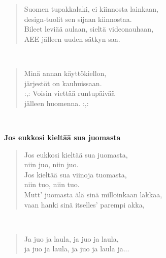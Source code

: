 \noindent\begin{minipage}{\linewidth}
\begin{verse}
	Suomen tupakkalaki, ei kiinnosta lainkaan,\\
	design-tuolit sen sijaan kiinnostaa.\\
	Bileet leviää aulaan, sieltä videonauhaan,\\
	AEE jälleen uuden sätkyn saa.\\
\end{verse}
\end{minipage}\\[10pt]
\noindent\begin{minipage}{\linewidth}
\begin{verse}
	Minä annan käyttökiellon,\\
	järjestöt on kauhuissaan.\\
	\hspace{0pt-\widthof{:,: }}:,: Voisin viettää runtupäivää\\
	jälleen huomenna. :,:\\
\end{verse}
\end{minipage}\\[10pt]
%
%
\noindent\begin{minipage}{\linewidth}
\vspace{5pt}
\parbox[t]{0.85\linewidth}{\raggedright {\large\bf Jos eukkosi kieltää sua juomasta}\\[6pt]}
\begin{verse}
	Jos eukkosi kieltää sua juomasta,\\
	niin juo, niin juo.\\
	Jos kieltää sua viinoja tuomasta,\\
	niin tuo, niin tuo.\\
	Mutt' juomasta älä sinä milloinkaan lakkaa,\\
	vaan hanki sinä itselles' parempi akka,\\
\end{verse}
\end{minipage}\\[10pt]
\noindent\begin{minipage}{\linewidth}
\begin{verse}
	Ja juo ja laula, ja juo ja laula,\\
	ja juo ja laula, ja juo ja laula ja...\\
\end{verse}
\end{minipage}\\[10pt]
